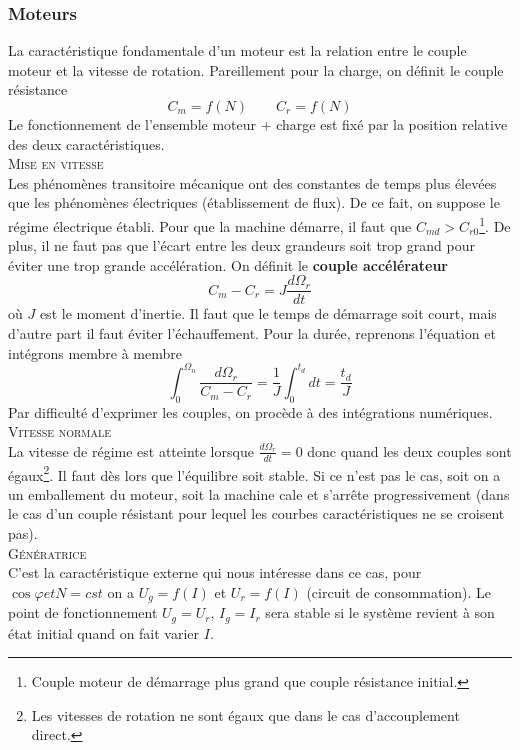 		\subsubsection{Moteurs}
			La caractéristique fondamentale d'un moteur est la relation entre le couple moteur et la vitesse de rotation. Pareillement pour la charge, on définit le couple résistance 
			\begin{equation}
				C_m = f(N) \qquad C_r = f(N)
			\end{equation}
			Le fonctionnement de l'ensemble moteur + charge est fixé par la position relative des deux caractéristiques. \\
			
			\textsc{Mise en vitesse}\\
				Les phénomènes transitoire mécanique ont des constantes de temps plus élevées que les phénomènes électriques (établissement de flux). De ce fait, on suppose le régime électrique établi. Pour que la machine démarre, il faut que $C_{md} > C_{r0}$\footnote{Couple moteur de démarrage plus grand que couple résistance initial.}. De plus, il ne faut pas que l'écart entre les deux grandeurs soit trop grand pour éviter une trop grande accélération. On définit le \textbf{couple accélérateur}
				\begin{equation}
					C_m - C_r = J\frac{d\Omega _r}{dt}
				\end{equation}
	où $J$ est le moment d'inertie. Il faut que le temps de démarrage soit court, mais d'autre part il faut éviter l'échauffement. Pour la durée, reprenons l'équation et intégrons membre à membre
	\begin{equation}
		\int _0^{\Omega _n} \frac{d\Omega _r}{C_m	- C_r} = \frac{1}{J}\int _0 ^{t_d} dt = \frac{t_d}{J}
	\end{equation}
	Par difficulté d'exprimer les couples, on procède à des intégrations numériques.\\
	
	\textsc{Vitesse normale}\\
	La vitesse de régime est atteinte lorsque $\frac{d\Omega _r}{dt} = 0$ donc quand les deux couples sont égaux\footnote{Les vitesses de rotation ne sont égaux que dans le cas d'accouplement direct.}. Il faut dès lors que l'équilibre soit stable. Si ce n'est pas le cas, soit on a un emballement du moteur, soit la machine cale et s'arrête progressivement (dans le cas d'un couple résistant pour lequel les courbes caractéristiques ne se croisent pas). \\
	
	\textsc{Génératrice}\\
	C'est la caractéristique externe qui nous intéresse dans ce cas, pour $\cos \varphi et N = cst$ on a $U_g = f(I)$ et $U_r = f(I)$ (circuit de consommation). Le point de fonctionnement $U_g = U_r$, $I_g = I_r$ sera stable si le système revient à son état initial quand on fait varier $I$. 
		
		
		
		
		
		
		
		
		
		
		
		
		
		
